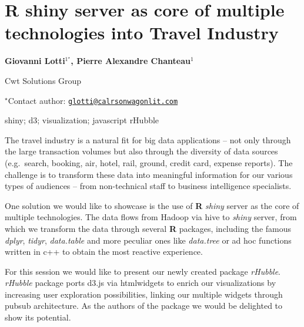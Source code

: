\documentclass[\main/boa.tex]{subfiles}
\begin{document}
\section{R shiny server as core of multiple technologies into Travel Industry}

\begin{center}
  {\bf {} Giovanni Lotti$^{1^\star}$,  Pierre Alexandre Chanteau$^{1}$}
\end{center}

\vskip 0.3cm

\begin{affiliations}
\begin{enumerate}
\begin{minipage}{0.915\textwidth}
\centering
\item Cwt Solutions Group \\[-2pt]
\end{minipage}
\end{enumerate}
$^\star$Contact author: \href{mailto:glotti@calrsonwagonlit.com}{\nolinkurl{glotti@calrsonwagonlit.com}}\\
\end{affiliations}

\vskip 0.5cm

\begin{minipage}{0.915\textwidth}
\keywords shiny; d3; visualization; javascript
\packages {} rHubble
\end{minipage}

\vskip 0.8cm

The travel industry is a natural fit for big data applications -- not
only through the large transaction volumes but also through the
diversity of data sources (e.g.~search, booking, air, hotel, rail,
ground, credit card, expense reports). The challenge is to transform
these data into meaningful information for our various types of
audiences -- from non-technical staff to business intelligence
specialists.

One solution we would like to showcase is the use of \textbf{R}
\emph{shiny} server as the core of multiple technologies. The data flows
from Hadoop via hive to \emph{shiny} server, from which we transform the
data through several \textbf{R} packages, including the famous
\emph{dplyr}, \emph{tidyr}, \emph{data.table} and more peculiar ones
like \emph{data.tree} or ad hoc functions written in c++ to obtain the
most reactive experience.

For this session we would like to present our newly created package
\emph{rHubble}. \emph{rHubble} package ports d3.js via htmlwidgets to
enrich our visualizations by increasing user exploration possibilities,
linking our multiple widgets through pubsub architecture. As the authors
of the package we would be delighted to show its potential.
\end{document}
